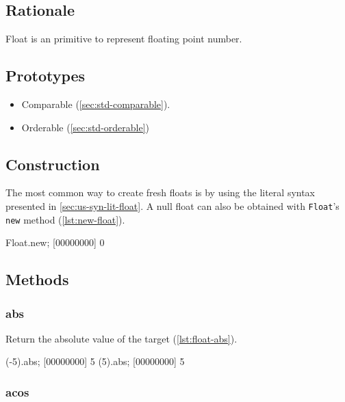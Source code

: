 \subsection{Rationale}

Float is an \us primitive to represent floating point number.

\subsection{Prototypes}

\begin{itemize}
\item Comparable (\autoref{sec:std-comparable}).
\item Orderable (\autoref{sec:std-orderable})
\end{itemize}

\subsection{Construction}

The most common way to create fresh floats is by using the literal
syntax presented in \autoref{sec:us-syn-lit-float}. A null float can also be
obtained with \lstinline|Float|'s \lstinline|new| method
(\autoref{lst:new-float}).

\begin{urbiscript}[caption=Creating a new float, label=lst:new-float,
  float=\floatpos]
  Float.new; [00000000] 0
\end{urbiscript}

\subsection{Methods}


\subsubsection{abs}

Return the absolute value of the target (\autoref{lst:float-abs}).

\begin{urbiscript}[caption=Float.abs, label=lst:float-abs,
  float=\floatposh]
  (-5).abs;
  [00000000] 5
  (5).abs;
  [00000000] 5
\end{urbiscript}

\subsubsection{acos}

